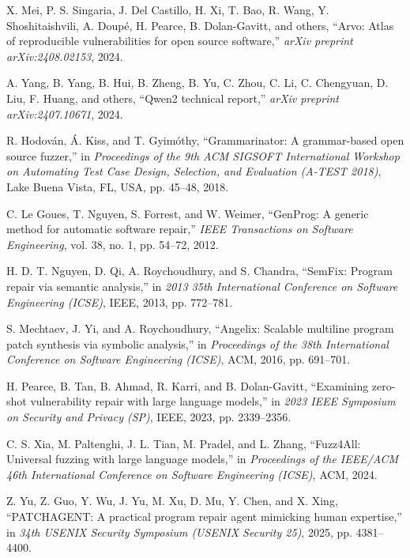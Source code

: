 X. Mei, P. S. Singaria, J. Del Castillo, H. Xi, T. Bao, R. Wang, Y. Shoshitaishvili, A. Doup\'{e}, H. Pearce, B. Dolan-Gavitt, and others, ``Arvo: Atlas of reproducible vulnerabilities for open source software,'' \textit{arXiv preprint arXiv:2408.02153}, 2024.

A. Yang, B. Yang, B. Hui, B. Zheng, B. Yu, C. Zhou, C. Li, C. Chengyuan, D. Liu, F. Huang, and others, ``Qwen2 technical report,'' \textit{arXiv preprint arXiv:2407.10671}, 2024.

R. Hodován, Á. Kiss, and T. Gyimóthy, ``Grammarinator: A grammar-based open source fuzzer,'' in \textit{Proceedings of the 9th ACM SIGSOFT International Workshop on Automating Test Case Design, Selection, and Evaluation (A-TEST 2018)}, Lake Buena Vista, FL, USA, pp. 45--48, 2018.


C. Le Goues, T. Nguyen, S. Forrest, and W. Weimer, ``GenProg: A generic method for automatic software repair,'' \textit{IEEE Transactions on Software Engineering}, vol. 38, no. 1, pp. 54--72, 2012.

H. D. T. Nguyen, D. Qi, A. Roychoudhury, and S. Chandra, ``SemFix: Program repair via semantic analysis,'' in \textit{2013 35th International Conference on Software Engineering (ICSE)}, IEEE, 2013, pp. 772--781.

S. Mechtaev, J. Yi, and A. Roychoudhury, ``Angelix: Scalable multiline program patch synthesis via symbolic analysis,'' in \textit{Proceedings of the 38th International Conference on Software Engineering (ICSE)}, ACM, 2016, pp. 691--701.

H. Pearce, B. Tan, B. Ahmad, R. Karri, and B. Dolan-Gavitt, ``Examining zero-shot vulnerability repair with large language models,'' in \textit{2023 IEEE Symposium on Security and Privacy (SP)}, IEEE, 2023, pp. 2339--2356.

C. S. Xia, M. Paltenghi, J. L. Tian, M. Pradel, and L. Zhang, ``Fuzz4All: Universal fuzzing with large language models,'' in \textit{Proceedings of the IEEE/ACM 46th International Conference on Software Engineering (ICSE)}, ACM, 2024.

Z. Yu, Z. Guo, Y. Wu, J. Yu, M. Xu, D. Mu, Y. Chen, and X. Xing, ``PATCHAGENT: A practical program repair agent mimicking human expertise,'' in \textit{34th USENIX Security Symposium (USENIX Security 25)}, 2025, pp. 4381--4400.


